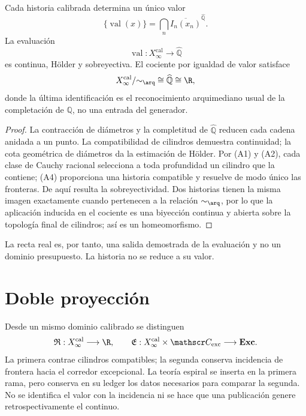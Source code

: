 \begin{theorem}
\label{thm:espiral-cierre-arquimediano-continuo-genealogico}
Cada historia calibrada determina un único valor
\[
 \{\operatorname{val}(x)\}
 =\bigcap_n\overline{I_n(x_n)}^{\widehat{\mathbb Q}}.
\]
La evaluación
\[
 \operatorname{val}:X_\infty^{\mathrm{cal}}\longrightarrow\widehat{\mathbb Q}
\]
es continua, Hölder y sobreyectiva. El cociente por igualdad de valor
satisface
\[
 X_\infty^{\mathrm{cal}}/{\sim_{\arq}}
 \cong\widehat{\mathbb Q}\cong\R,
\]
donde la última identificación es el reconocimiento arquimediano usual de
la completación de \(\mathbb Q\), no una entrada del generador.
\end{theorem}
\begin{proof}
La contracción de diámetros y la completitud de \(\widehat{\mathbb Q}\) reducen cada
cadena anidada a un punto. La compatibilidad de cilindros demuestra continuidad; la
cota geométrica de diámetros da la estimación de Hölder. Por (A1) y (A2),
cada clase de Cauchy racional selecciona a toda profundidad un cilindro que
la contiene;
(A4) proporciona una historia compatible y resuelve de modo único las
fronteras. De aquí resulta la sobreyectividad. Dos historias tienen la misma
imagen exactamente cuando pertenecen a la relación \(\sim_{\arq}\), por lo
que la aplicación inducida en el cociente es una biyección continua y abierta
sobre la topología final de cilindros; así es un homeomorfismo.
\end{proof}

La recta real es, por tanto, una salida demostrada de la evaluación y no un
dominio presupuesto. La historia no se reduce a su valor.

\section{Doble proyección}

Desde un mismo dominio calibrado se distinguen
\[
 \mathfrak R:X_\infty^{\mathrm{cal}}\longrightarrow\R,
 \qquad
 \mathfrak E:X_\infty^{\mathrm{cal}}\times\mathscr C_{\mathrm{exc}}
 \longrightarrow\mathbf{Exc}.
\]
La primera contrae cilindros compatibles; la segunda conserva incidencia de
frontera hacia el corredor excepcional. La teoría espiral se inserta en la
primera rama, pero conserva en su ledger los datos necesarios para comparar
la segunda. No se identifica el valor con la incidencia ni se hace que una
publicación genere retrospectivamente el continuo.

